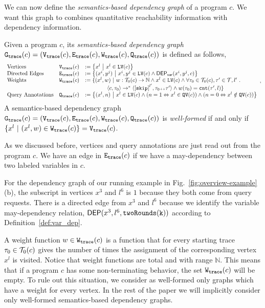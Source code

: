 We can now define the \emph{semantics-based dependency graph} of a program $c$. We want this graph to combines quantitative reachability information with dependency information. 
\begin{defn}
\label{def:trace_graph}
Given a program ${c}$,
its \emph{semantics-based dependency graph} 
$\mathtt{{G_{trace}}}({c}) = (\mathtt{{V_{trace}}}({c}), \mathtt{{E_{trace}}}({c}), \mathtt{{W_{trace}}}({c}), \mathtt{{Q_{trace}}}({c}))$ is defined as follows,
{\small
\[
\begin{array}{lll}
  \text{Vertices} &
  \traceV({c}) & := \left\{ 
  x^l
  ~ \middle\vert ~ x^l \in \lvar(c)
  \right\}
  \\
  \text{Directed Edges} &
  \traceE({c}) & := 
  \left\{ 
  (x^i, y^j) 
  ~ \middle\vert ~
  x^i, y^j \in \lvar(c) \land \vardep(x^i, y^j, c) 
  \right\}
  \\
  \text{Weights} &
  \traceW({c}) & := 
  \{ 
  (x^l, w) 
  ~ \vert ~ 
  w : \tdom_0(c) \to \mathbb{N}
  \land
  x^l \in \lvar(c) \land
  \forall \trace_0 \in \tdom_0(c), \trace' \in \tdom, l' \st
  \\ & & \qquad \qquad
  \config{{c}, \trace_0} \to^{*} 
  \config{\clabel{\eskip}^{l'}, \trace_0 \tracecat \trace'} 
  \land w(\trace_0) = \vcounter(\trace', l) \} 
   \\
  \text{Query Annotations} &
  \traceF({c}) & := 
\left\{(x^l, n)  
~ \middle\vert ~
 x^l \in \lvar(c) \land
(n = 1 \Leftrightarrow x^l \in \qvar(c))\land ( n = 0 \Leftrightarrow  x^l \notin \qvar(c))
\right\}
\end{array},
\]
A semantics-based dependency graph $\mathtt{{G_{trace}}}({c})= (\mathtt{{V_{trace}}}({c}), \mathtt{{E_{trace}}}({c}), \mathtt{{W_{trace}}}({c}), \mathtt{{Q_{trace}}}({c}))$ is \emph{well-formed} if and only if $ \{x^l \ |\ (x^l,w)\in \mathtt{{W_{trace}}}({c})\} = \mathtt{{V_{trace}}}({c}) $.
}
\end{defn}
As we discussed before, vertices and query annotations are just read out from the program $c$. We have an edge in $\mathtt{{E_{trace}}}(c)$ if we have a may-dependency between two labeled variables in $c$.

For the dependency graph of our running example in Fig.~\ref{fig:overview-example}(b),
the subscript in vertices $x^3$ and $l^6$ is $1$ because they both come from query requests.
There is a directed edge from $x^3$ and $l^6$ because we identify the variable may-dependency relation, $\mathsf{DEP}(x^3, l^6, \mathtt{twoRounds(k)})$ according to Definition~\ref{def:var_dep}.

A weight function $w \in \mathtt{{W_{trace}}}(c)$ is a function that for every starting trace $\mathtt{\tau}_0 \in \mathcal{T}_0(c)$ 
gives the number of times the assignment of the corresponding vertex $x^l$ is visited. Notice that weight functions are total and with range $\mathbb{N}$. This means that if a program $c$ has some non-terminating behavior, the set $\mathtt{{W_{trace}}}(c)$ will be empty. 
To rule out this situation, we consider as well-formed only graphs which have a weight for every vertex. 
In the rest of the paper we will implicitly consider only well-formed semantics-based dependency graphs. 


